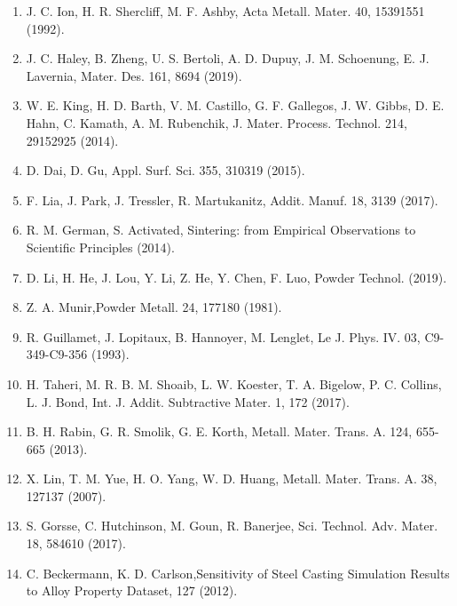 \documentclass[10pt]{article}
\begin{document}
\begin{enumerate}
  \item J. C. Ion, H. R. Shercliff, M. F. Ashby, Acta Metall. Mater. 40, 15391551 (1992).

  \item J. C. Haley, B. Zheng, U. S. Bertoli, A. D. Dupuy, J. M. Schoenung, E. J. Lavernia, Mater. Des. 161, 8694 (2019).

  \item W. E. King, H. D. Barth, V. M. Castillo, G. F. Gallegos, J. W. Gibbs, D. E. Hahn, C. Kamath, A. M. Rubenchik, J. Mater. Process. Technol. 214, 29152925 (2014).

  \item D. Dai, D. Gu, Appl. Surf. Sci. 355, 310319 (2015).

  \item F. Lia, J. Park, J. Tressler, R. Martukanitz, Addit. Manuf. 18, 3139 (2017).

  \item R. M. German, S. Activated, Sintering: from Empirical Observations to Scientific Principles (2014).

  \item D. Li, H. He, J. Lou, Y. Li, Z. He, Y. Chen, F. Luo, Powder Technol. (2019).

  \item Z. A. Munir,Powder Metall. 24, 177180 (1981).

  \item R. Guillamet, J. Lopitaux, B. Hannoyer, M. Lenglet, Le J. Phys. IV. 03, C9-349-C9-356 (1993).

  \item H. Taheri, M. R. B. M. Shoaib, L. W. Koester, T. A. Bigelow, P. C. Collins, L. J. Bond, Int. J. Addit. Subtractive Mater. 1, 172 (2017).

  \item B. H. Rabin, G. R. Smolik, G. E. Korth, Metall. Mater. Trans. A. 124, 655-665 (2013).

  \item X. Lin, T. M. Yue, H. O. Yang, W. D. Huang, Metall. Mater. Trans. A. 38, 127137 (2007).

  \item S. Gorsse, C. Hutchinson, M. Goun, R. Banerjee, Sci. Technol. Adv. Mater. 18, 584610 (2017).

  \item C. Beckermann, K. D. Carlson,Sensitivity of Steel Casting Simulation Results to Alloy Property Dataset, 127 (2012).

\end{enumerate}
\end{document}
